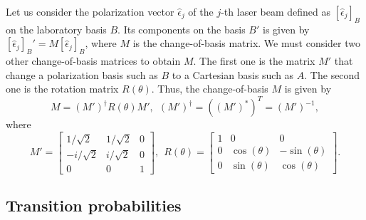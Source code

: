 Let us consider the polarization vector $ \hat{\epsilon}_j $ of the $ j $-th laser beam defined as $ [\hat{\epsilon}_j]_B $ on the laboratory basis $ B $. Its components on the basis $ B' $ is given by $ [\hat{\epsilon}_j]_B' = M [\hat{\epsilon}_j]_B $, where $ M $ is the change-of-basis matrix. We must consider two other change-of-basis matrices to obtain $ M $. The first one is the matrix $ M' $ that change a polarization basis such as $ B $ to a Cartesian basis such as $ A $. The second one is the rotation matrix $ R(\theta) $. Thus, the change-of-basis $ M $ is given by
\begin{equation}
    M = (M')^{\dagger}R(\theta)M',\ \ (M')^{\dagger} = ((M')^*)^T = (M')^{-1},
\end{equation}
where
\begin{equation}
    M' = \left[ \begin{matrix}
        1/\sqrt{2} & 1/\sqrt{2} & 0 \\
        -i/\sqrt{2} & i/\sqrt{2} & 0 \\
        0 & 0 & 1
    \end{matrix} \right],\ \
    R(\theta) = \left[ \begin{matrix}
        1 & 0 & 0 \\
        0 & \cos(\theta) & -\sin(\theta) \\
        0 & \sin(\theta) & \cos(\theta)
    \end{matrix} \right].
\end{equation}

\subsection{Transition probabilities}
\label{sec:transition-probabilities}

